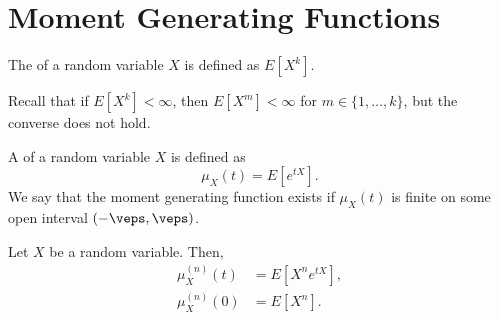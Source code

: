 \documentclass[11pt]{article}
\begin{document}
\section{Moment Generating Functions}

\begin{defn}
The  of a random variable $X$ is defined as $E[X^k]$.
\end{defn}

\begin{rmk}
Recall that if $E[X^k]<\infty$, then $E[X^m]<\infty$ for $m \in \{1,\dots,k\}$, but the converse does not hold.
\end{rmk}

\begin{defn}
A  of a random variable $X$ is defined as
\[
\mu_X(t)=E[e^{tX}].
\]
We say that the moment generating function exists if $\mu_X(t)$ is finite on some open interval $(-\veps,\veps)$.
\end{defn}


\begin{thm}
Let $X$ be a random variable. Then,
\begin{align*}
    \mu^{(n)}_X(t)&=E[X^ne^{tX}], 
    \\ \mu_X^{(n)}(0) &=E[X^n].
\end{align*}
\end{thm}

\end{document}
